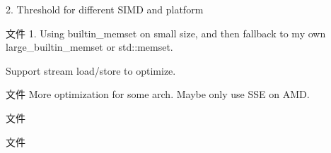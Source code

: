 \begin{DoxyRefList}
2. Threshold for different SIMD and platform 
\item[文件 \doxylink{math_2set_8hpp}{set.hpp} ]\label{todo__todo000038}%
%
1. Using builtin\+\_\+memset on small size, and then fallback to my own large\+\_\+builtin\+\_\+memset or std\+::memset.
\begin{DoxyEnumerate}
\item Support stream load/store to optimize. 
\end{DoxyEnumerate}
\item[文件 \doxylink{shift_8cpp}{shift.cpp} ]\label{todo__todo000048}%
%
More optimization for some arch. Maybe only use SSE on AMD. 
\item[文件 \doxylink{arch_2x86_2simd_2simd_8hpp}{simd.hpp} ]\label{todo__todo000003}%
%
 
\item[文件 \doxylink{container_2vector_8hpp}{vector.hpp} ]\label{todo__todo000021}%
%


\end{DoxyRefList}
